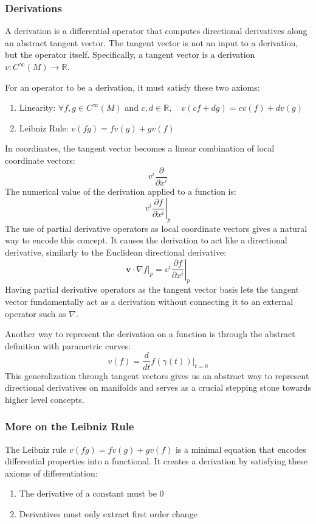 \documentclass[12pt]{article}
\newcommand{\R}{\mathbb{R}}
\newcommand{\p}{\partial}
\newcommand{\at}[2]{\left. #1 \right|_{#2}}
\newcommand{\bv}[1]{\mathbf{#1}}
\begin{document}
\subsubsection{Derivations}
A derivation is a differential operator that computes directional derivatives along an abstract tangent vector. The tangent vector is not an input to a derivation, but the operator itself. Specifically, a tangent vector is a derivation $v:C^{\infty}{(M)} \to \R$.

For an operator to be a derivation, it must satisfy these two axioms:
\begin{enumerate}
    \item Linearity: $\forall f,g \in C^{\infty}(M)$ and $c,d \in \R, \quad v(cf + dg) = cv(f)+dv(g)$
    \item Leibniz Rule: $v(fg) =fv(g)+gv(f)$
\end{enumerate}
In coordinates, the tangent vector becomes a linear combination of local coordinate vectors:
\[
v^i\frac{\p}{\p x^i}
\]
The numerical value of the derivation applied to a function is:
\[
v^i\at{\frac{\p f}{\p x^i}}{p} 
\]
The use of partial derivative operators as local coordinate vectors gives a natural way to encode this concept. It causes the derivation to act like a directional derivative, similarly to the Euclidean directional derivative:
\[
\bv{v} \cdot \at{\nabla f}{p} = v^i \at{\frac{\p f}{\p x^i}}{p}
\]
Having partial derivative operators as the tangent vector basis lets the tangent vector fundamentally act as a derivation without connecting it to an external operator such as $\nabla$.

Another way to represent the derivation on a function is through the abstract definition with parametric curves:
\[
v(f)=\frac{d}{dt}\at{f(\gamma(t))}{t=0}
\]
This generalization through tangent vectors gives us an abstract way to represent directional derivatives on manifolds and serves as a crucial stepping stone towards higher level concepts.
\subsubsection{More on the Leibniz Rule}
The Leibniz rule $v(fg)=fv(g)+gv(f)$ is a minimal equation that encodes differential properties into a functional. It creates a derivation by satisfying these axioms of differentiation:
\begin{enumerate}
    \item The derivative of a constant must be 0
    \item Derivatives must only extract first order change
\end{enumerate}
\end{document}
